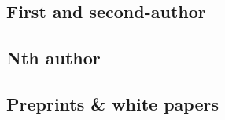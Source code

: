 \documentclass[12pt,letterpaper]{article}
\begin{document}
                                                            
                                                                                
\subsection*{First and second-author}                              
                                                                                
\begin{list}{}{\cvlist}                                                         
                                                        
\end{list}                                                                      
                                                                                
\subsection*{Nth author}                                           
                                                                                
\begin{list}{}{\cvlist}                                                         
                                                                
\end{list}                                                                      
                                                                                
\subsection*{Preprints \& white papers}                                         
                                                                                
\begin{list}{}{\cvlist}                                                         
                                                              
\end{list}    
\end{document}
